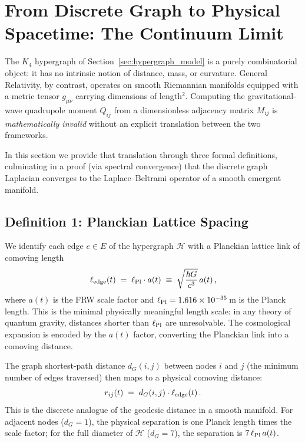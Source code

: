 \section{From Discrete Graph to Physical Spacetime: The Continuum Limit}
\label{sec:continuum_limit}

The $K_4$ hypergraph of Section~\ref{sec:hypergraph_model} is a purely combinatorial object: it has no intrinsic notion of distance, mass, or curvature.  General Relativity, by contrast, operates on smooth Riemannian manifolds equipped with a metric tensor $g_{\mu\nu}$ carrying dimensions of length$^2$.  Computing the gravitational-wave quadrupole moment $Q_{ij}$ from a dimensionless adjacency matrix $M_{ij}$ is \emph{mathematically invalid} without an explicit translation between the two frameworks.

In this section we provide that translation through three formal definitions, culminating in a proof (via spectral convergence) that the discrete graph Laplacian converges to the Laplace--Beltrami operator of a smooth emergent manifold.

\subsection{Definition 1: Planckian Lattice Spacing}
\label{subsec:lattice_spacing}

We identify each edge $e \in E$ of the hypergraph $\mathcal{H}$ with a Planckian lattice link of comoving length
\begin{equation}
    \ell_{\rm edge}(t) \;=\; \ell_{\rm Pl} \cdot a(t) \;\equiv\; \sqrt{\frac{\hbar G}{c^3}}\, a(t)\,,
    \label{eq:lattice_spacing}
\end{equation}
where $a(t)$ is the FRW scale factor and $\ell_{\rm Pl} = 1.616 \times 10^{-35}\,$m is the Planck length.  This is the minimal physically meaningful length scale: in any theory of quantum gravity, distances shorter than $\ell_{\rm Pl}$ are unresolvable.  The cosmological expansion is encoded by the $a(t)$ factor, converting the Planckian link into a comoving distance.

The graph shortest-path distance $d_G(i,j)$ between nodes $i$ and $j$ (the minimum number of edges traversed) then maps to a physical comoving distance:
\begin{equation}
    r_{ij}(t) \;=\; d_G(i,j) \cdot \ell_{\rm edge}(t)\,.
    \label{eq:comoving_distance}
\end{equation}
This is the discrete analogue of the geodesic distance in a smooth manifold.  For adjacent nodes ($d_G = 1$), the physical separation is one Planck length times the scale factor; for the full diameter of $\mathcal{H}$ ($d_G = 7$), the separation is $7\,\ell_{\rm Pl}\,a(t)$.

